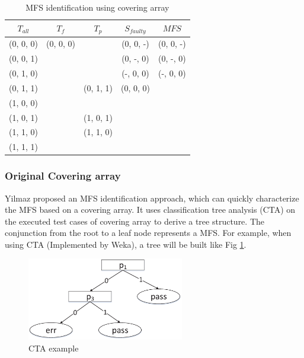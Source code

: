 \documentclass[10pt,journal,cspaper,compsoc]{IEEEtran}
\begin{document}
\begin{table}
\centering
\caption{MFS identification using covering array}
\label{mfs-coveing-array}
  \begin{tabular}{c| c | c | c | c }
  \hline
  $T_{all}$ & $T_{f}$ & $T_{p}$ & $S_{faulty}$ & $MFS$ \\ \hline
(0, 0, 0) & (0, 0, 0) &           & (0, 0, -) & (0, 0, -)\\
(0, 0, 1) &           &           & (0, -, 0) & (0, -, 0)\\
(0, 1, 0) &           &           & (-, 0, 0) & (-, 0, 0)\\
(0, 1, 1) &           & (0, 1, 1) & (0, 0, 0) &\\
(1, 0, 0) &           &           &           &\\
(1, 0, 1) &           & (1, 0, 1) &           &\\
(1, 1, 0) &           & (1, 1, 0) &           &\\
(1, 1, 1) &           &           &           &\\\hline
  \end{tabular}
  \end{table}

\subsubsection{Original Covering array}
Yilmaz \cite{yilmaz2006covering} proposed an MFS identification approach, which can quickly characterize the MFS based on a covering array. It uses classification tree analysis (CTA) on the executed test cases of covering array to derive a tree structure. The conjunction from the root to a leaf node represents a MFS. For example, when using CTA (Implemented by Weka\cite{hall2009weka}), a tree will be built like Fig \ref{figcta}.

\begin{figure}
 \centering
 \includegraphics[width=2.7in]{cta_example.eps}
 \caption{CTA example}
 \label{figcta}
\end{figure}
\end{document}
